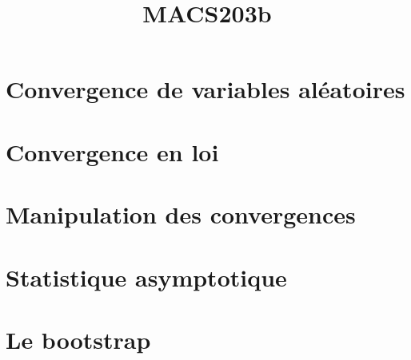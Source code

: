 \documentclass[a4paper,9pt]{article}
\title{\vspace{-1.2cm} \textbf{MACS203b}}
\begin{document}
\maketitle

\vspace{-1.5cm}


\section{Convergence de variables aléatoires}
	

\section{Convergence en loi}
	

\section{Manipulation des convergences}
	

\section{Statistique asymptotique}
	

\section{Le bootstrap}
	
\end{document}
